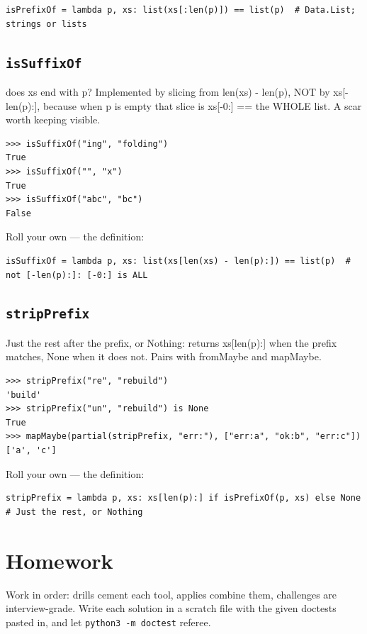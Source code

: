 \documentclass[10pt,letterpaper]{book}
\begin{document}
\begin{lstlisting}[style=ex]
isPrefixOf = lambda p, xs: list(xs[:len(p)]) == list(p)  # Data.List; strings or lists
\end{lstlisting}
\subsection{\texttt{isSuffixOf}}\label{def:isSuffixOf}
does xs end with p? Implemented by slicing from len(xs) - len(p), NOT by xs[-len(p):], because when p is empty that slice is xs[-0:] == the WHOLE list. A scar worth keeping visible.
\begin{lstlisting}[style=ex]
>>> isSuffixOf("ing", "folding")
True
>>> isSuffixOf("", "x")
True
>>> isSuffixOf("abc", "bc")
False
\end{lstlisting}

Roll your own --- the definition:

\begin{lstlisting}[style=ex]
isSuffixOf = lambda p, xs: list(xs[len(xs) - len(p):]) == list(p)  # not [-len(p):]: [-0:] is ALL
\end{lstlisting}
\subsection{\texttt{stripPrefix}}\label{def:stripPrefix}
Just the rest after the prefix, or Nothing: returns xs[len(p):] when the prefix matches, None when it does not. Pairs with fromMaybe and mapMaybe.
\begin{lstlisting}[style=ex]
>>> stripPrefix("re", "rebuild")
'build'
>>> stripPrefix("un", "rebuild") is None
True
>>> mapMaybe(partial(stripPrefix, "err:"), ["err:a", "ok:b", "err:c"])
['a', 'c']
\end{lstlisting}

Roll your own --- the definition:

\begin{lstlisting}[style=ex]
stripPrefix = lambda p, xs: xs[len(p):] if isPrefixOf(p, xs) else None  # Just the rest, or Nothing
\end{lstlisting}

\section{Homework}
Work in order: drills cement each tool, applies combine them,
challenges are interview-grade. Write each solution in a scratch file with
the given doctests pasted in, and let \texttt{python3 -m doctest} referee.
\end{document}
